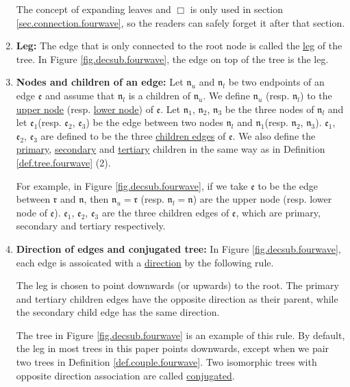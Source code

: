 \begin{defn}
\begin{enumerate}
 The concept of expanding leaves and $\Box$ is only used in section \ref{sec.connection.fourwave}, so the readers can safely forget it after that section.

 \item \textbf{Leg:} The edge that is only connected to the root node is called the \underline{leg} of the tree. In Figure \ref{fig.decsub.fourwave}, the edge on top of the tree is the leg.
 
 \item \textbf{Nodes and children of an edge:} Let $\mathfrak{n}_{u}$ and $\mathfrak{n}_{l}$ be two endpoints of an edge $\mathfrak{e}$ and assume that $\mathfrak{n}_{l}$ is a children of $\mathfrak{n}_{u}$. We define $\mathfrak{n}_{u}$ (resp. $\mathfrak{n}_{l}$) to the \underline{upper node} (resp. \underline{lower node}) of $\mathfrak{e}$. Let $\mathfrak{n}_1$, $\mathfrak{n}_2$, $\mathfrak{n}_3$ be the three nodes of $\mathfrak{n}_{l}$ and let $\mathfrak{e}_1$(resp. $\mathfrak{e}_2$, $\mathfrak{e}_3$) be the edge between two nodes $\mathfrak{n}_{l}$ and $\mathfrak{n}_1$(resp. $\mathfrak{n}_2$, $\mathfrak{n}_3$). $\mathfrak{e}_1$, $\mathfrak{e}_2$, $\mathfrak{e}_3$ are defined to be the three \underline{children edges} of $\mathfrak{e}$. We also define the \underline{primary}, \underline{secondary} and \underline{tertiary} children in the same way as in Definition \ref{def.tree.fourwave} (2).
 
 For example, in Figure \ref{fig.decsub.fourwave}, if we take $\mathfrak{e}$ to be the edge between $\mathfrak{r}$ and $\mathfrak{n}$, then $\mathfrak{n}_{u} = \mathfrak{r}$ (resp. $\mathfrak{n}_{l} = \mathfrak{n}$) are the upper node (resp. lower node of $\mathfrak{e}$). $\mathfrak{e}_1$, $\mathfrak{e}_2$, $\mathfrak{e}_3$ are the three children edges of $\mathfrak{e}$, which are primary, secondary and tertiary respectively.

 \item \textbf{Direction of edges and conjugated tree:} In Figure \ref{fig.decsub.fourwave}, each edge is assoicated with a \underline{direction} by the following rule. 
 
 The leg is chosen to point downwards (or upwards) to the root. The primary and tertiary children edges have the opposite direction as their parent, while the secondary child edge has the same direction.

 The tree in Figure \ref{fig.decsub.fourwave} is an example of this rule. By default, the leg in most trees in this paper points downwards, except when we pair two trees in Definition \ref{def.couple.fourwave}. Two isomorphic trees with opposite direction association are called \underline{conjugated}.


\end{enumerate}
\end{defn}
